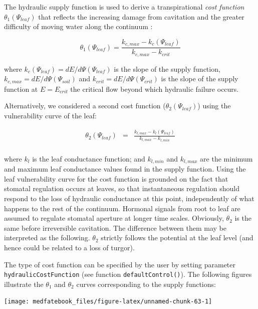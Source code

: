 \documentclass[]{book}
\begin{document}
The hydraulic supply function is used to derive a transpirational
\emph{cost function} \(\theta_1(\Psi_{leaf})\) that reflects the
increasing damage from cavitation and the greater difficulty of moving
water along the continuum \citep{Sperry2016a}:

\begin{equation}
\theta_1(\Psi_{leaf}) = \frac{k_{c,max}-k_{c}(\Psi_{leaf})}{k_{c,max}-k_{crit}}
\end{equation}

where \(k_c(\Psi_{leaf}) = dE/d\Psi(\Psi_{leaf})\) is the slope of the
supply function, \(k_{c,max} = dE/d\Psi(\Psi_{soil})\) and
\(k_{crit} = dE/d\Psi(\Psi_{crit})\) is the slope of the supply function
at \(E = E_{crit}\) the critical flow beyond which hydraulic failure
occurs.

Alternatively, we considered a second cost function
(\(\theta_2(\Psi_{leaf})\)) using the vulnerability curve of the leaf:

\begin{eqnarray}
\theta_2(\Psi_{leaf}) &=& \frac{k_{l, max}-k_l(\Psi_{leaf})}{k_{l,max} - k_{l,min}}\\
\end{eqnarray}

where \(k_l\) is the leaf conductance function; and \(k_{l,min}\) and
\(k_{l,max}\) are the minimum and maximum leaf conductance values found
in the supply function. Using the leaf vulnerability curve for the cost
function is grounded on the fact that stomatal regulation occurs at
leaves, so that instantaneous regulation should respond to the loss of
hydraulic conductance at this point, independently of what happens to
the rest of the continuum. Hormonal signals from root to leaf are
assumed to regulate stomatal aperture at longer time scales. Obviously,
\(\theta_2\) is the same before irreversible cavitation. The difference
between them may be interpreted as the following. \(\theta_2\) strictly
follows the potential at the leaf level (and hence could be related to a
loss of turgor).

The type of cost function can be specified by the user by setting
parameter \texttt{hydraulicCostFunction} (see function
\texttt{defaultControl()}). The following figures illustrate the
\(\theta_1\) and \(\theta_2\) curves corresponding to the supply
functions:

\begin{center}\texttt{[image: medfatebook\_files/figure-latex/unnamed-chunk-63-1]} \end{center}
\end{document}

